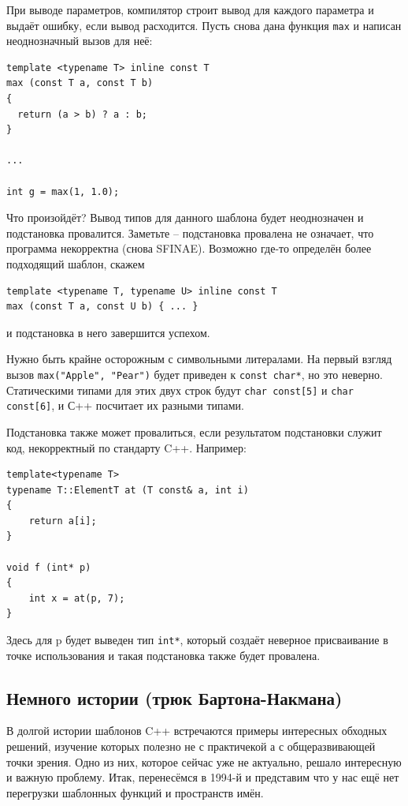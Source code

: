 \documentclass[a4paper,12pt,oneside]{article}
\begin{document}
При выводе параметров, компилятор строит вывод для каждого параметра и выдаёт ошибку, если вывод расходится. Пусть снова дана функция \lstinline!max! и написан неоднозначный вызов для неё:

\begin{lstlisting}
template <typename T> inline const T 
max (const T a, const T b)
{
  return (a > b) ? a : b;
} 

...

int g = max(1, 1.0);

\end{lstlisting}

Что произойдёт? Вывод типов для данного шаблона будет неоднозначен и подстановка провалится. Заметьте -- подстановка провалена не означает, что программа некорректна (снова SFINAE). Возможно где-то определён более подходящий шаблон, скажем 

\begin{lstlisting}
template <typename T, typename U> inline const T 
max (const T a, const U b) { ... }
\end{lstlisting}

и подстановка в него завершится успехом. 

Нужно быть крайне осторожным с символьными литералами. На первый взгляд вызов \lstinline!max("Apple", "Pear")! будет приведен к \lstinline!const char*!, но это неверно. Статическими типами для этих двух строк будут \lstinline!char const[5]! и \lstinline!char const[6]!, и С++ посчитает их разными типами.

Подстановка также может провалиться, если результатом подстановки служит код, некорректный по стандарту C++. Например:

\begin{lstlisting}
template<typename T> 
typename T::ElementT at (T const& a, int i) 
{ 
    return a[i]; 
} 

void f (int* p) 
{ 
    int x = at(p, 7); 
} 
\end{lstlisting}

Здесь для p будет выведен тип \lstinline!int*!, который создаёт неверное присваивание в точке использования и такая подстановка также будет провалена.

\subsection{Немного истории (трюк Бартона-Накмана)}

В долгой истории шаблонов C++ встречаются примеры интересных обходных решений, изучение которых полезно не с практичекой а с общеразвивающей точки зрения. Одно из них, которое сейчас уже не актуально, решало интересную и важную проблему. Итак, перенесёмся в 1994-й и представим что у нас ещё нет перегрузки шаблонных функций и пространств имён.
\end{document}
